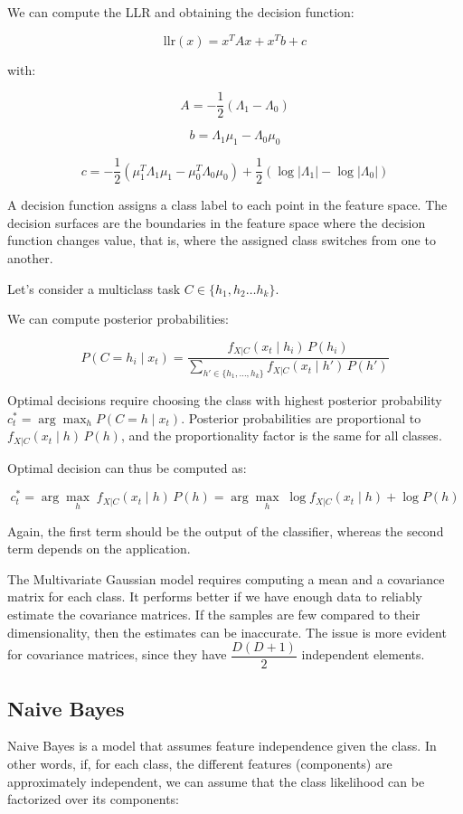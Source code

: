 We can compute the LLR and obtaining the decision function:

$$\mathrm{llr}(x) = x^T A x + x^T b + c$$

with:

$$A = -\frac{1}{2}(\Lambda_1 - \Lambda_0)$$

$$b = \Lambda_1\mu_1 - \Lambda_0\mu_0$$

$$c = -\frac{1}{2}\!\left(\mu_1^T\Lambda_1\mu_1 - \mu_0^T\Lambda_0\mu_0\right) + \frac{1}{2}\!\left(\log|\Lambda_1| - \log|\Lambda_0|\right)$$

A decision function assigns a class label to each point in the feature space. The decision surfaces are the boundaries in the feature space where the decision function changes value, that is, where the assigned class switches from one to another.

Let's consider a multiclass task $C \in \{h_1, h_2 \ldots h_k\}$.

We can compute posterior probabilities:

$$P(C = h_i \mid x_t) = \frac{f_{X|C}(x_t \mid h_i)\,P(h_i)}{\displaystyle\sum_{h' \in \{h_1,\ldots,h_k\}} f_{X|C}(x_t \mid h')\,P(h')}$$

Optimal decisions require choosing the class with highest posterior probability $c_t^* = \arg\max_h P(C = h \mid x_t)$. Posterior probabilities are proportional to $f_{X|C}(x_t \mid h)\,P(h)$, and the proportionality factor is the same for all classes.

Optimal decision can thus be computed as:

$$c_t^* = \arg\max_h\; f_{X|C}(x_t \mid h)\,P(h) = \arg\max_h\;\log f_{X|C}(x_t \mid h) + \log P(h)$$

Again, the first term should be the output of the classifier, whereas the second term depends on the application.

The Multivariate Gaussian model requires computing a mean and a covariance matrix for each class. It performs better if we have enough data to reliably estimate the covariance matrices. If the samples are few compared to their dimensionality, then the estimates can be inaccurate. The issue is more evident for covariance matrices, since they have $\dfrac{D(D+1)}{2}$ independent elements.

\subsection{Naive Bayes}

Naive Bayes is a model that assumes feature independence given the class. In other words, if, for each class, the different features (components) are approximately independent, we can assume that the class likelihood can be factorized over its components:

